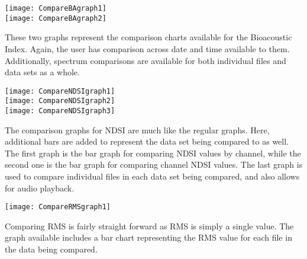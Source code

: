 \begin{center}
	\texttt{[image: CompareBAgraph1]} \\[12pt]
	\texttt{[image: CompareBAgraph2]} \\[12pt]
\end{center}

These two graphs represent the comparison charts available for the Bioacoustic Index. Again, the user has comparison across date and time available to them. Additionally, spectrum comparisons are available for both individual files and data sets as a whole.\\

\begin{center}
	\texttt{[image: CompareNDSIgraph1]} \\[12pt]
	\texttt{[image: CompareNDSIgraph2]} \\[12pt]
	\texttt{[image: CompareNDSIgraph3]} \\[12pt]
\end{center}

The comparison graphs for NDSI are much like the regular graphs. Here, additional bars are added to represent the data set being compared to as well. The first graph is the bar graph for comparing NDSI values by channel, while the second one is the bar graph for comparing channel NDSI values. The last graph is used to compare individual files in each data set being compared, and also allows for audio playback.\\

\begin{center}
	\texttt{[image: CompareRMSgraph1]} \\[12pt]
\end{center}

Comparing RMS is fairly straight forward as RMS is simply a single value. The graph available includes a bar chart representing the RMS value for each file in the data being compared.

